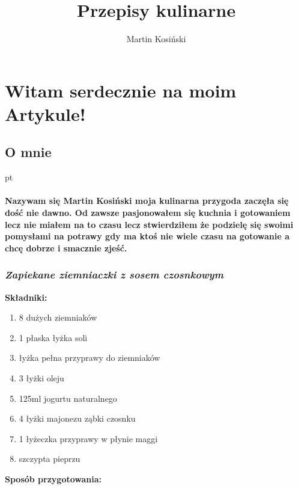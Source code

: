\documentclass[a4paper]{article}
\title{Przepisy kulinarne}
\author{Martin Kosiński}
\begin{document}
\section{\huge\textbf{Witam serdecznie na moim  Artykule!}}

\subsection{ \huge O mnie }
 pt 
\paragraph{Nazywam się Martin Kosiński moja kulinarna przygoda zaczęła się dość  nie dawno. Od zawsze  pasjonowałem się kuchnia  i gotowaniem lecz  nie miałem na  to czasu  lecz stwierdziłem że podzielę  się swoimi  pomysłami  na  potrawy  gdy  ma  ktoś  nie wiele  czasu  na gotowanie a chcę dobrze  i  smacznie zjeść. }

\maketitle



\subsubsection{\huge\textit{Zapiekane ziemniaczki z sosem czosnkowym}}


\Large \textbf {Składniki:}

\begin{enumerate}[*]
\raggedleft
\item 8 dużych ziemniaków\newline
\item 1 płaska łyżka soli\newline
\item łyżka pełna przyprawy do ziemniaków\newline
\item 3 łyżki oleju\newline
 
\item 125ml jogurtu naturalnego\newline
\item 4 łyżki majonezu\newline
{} ząbki czosnku\newline
\item 1 łyżeczka przyprawy w płynie maggi\newline
\item szczypta pieprzu\newline
\end{enumerate}
\Large \textbf{Sposób przygotowania:}
\end{document}
